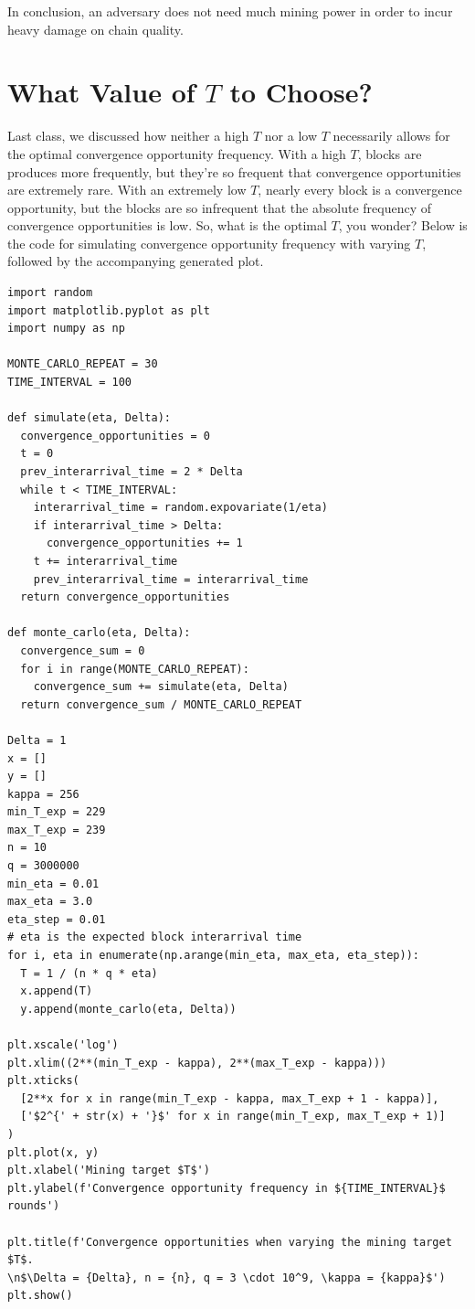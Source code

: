 In conclusion, an adversary does not need much mining power in order to incur heavy damage on chain quality.

\section{What Value of $T$ to Choose?}
Last class, we discussed how neither a high $T$ nor a low $T$ necessarily allows for the optimal convergence opportunity frequency. With a high $T$, blocks are produces more frequently, but they're so frequent that convergence opportunities are extremely rare. With an extremely low $T$, nearly every block is a convergence opportunity, but the blocks are so infrequent that the absolute frequency of convergence opportunities is low. So, what is the optimal $T$, you wonder? Below is the code for simulating convergence opportunity frequency with varying $T$, followed by the accompanying generated plot.
\begin{tcolorbox}[colback=gray!30]
{\small\begin{alltt}
\begin{verbatim}
import random
import matplotlib.pyplot as plt
import numpy as np

MONTE_CARLO_REPEAT = 30
TIME_INTERVAL = 100

def simulate(eta, Delta):
  convergence_opportunities = 0
  t = 0
  prev_interarrival_time = 2 * Delta
  while t < TIME_INTERVAL:
    interarrival_time = random.expovariate(1/eta)
    if interarrival_time > Delta:
      convergence_opportunities += 1
    t += interarrival_time
    prev_interarrival_time = interarrival_time
  return convergence_opportunities

def monte_carlo(eta, Delta):
  convergence_sum = 0
  for i in range(MONTE_CARLO_REPEAT):
    convergence_sum += simulate(eta, Delta)
  return convergence_sum / MONTE_CARLO_REPEAT

Delta = 1
x = []
y = []
kappa = 256
min_T_exp = 229
max_T_exp = 239
n = 10
q = 3000000
min_eta = 0.01
max_eta = 3.0
eta_step = 0.01
# eta is the expected block interarrival time
for i, eta in enumerate(np.arange(min_eta, max_eta, eta_step)):
  T = 1 / (n * q * eta)
  x.append(T)
  y.append(monte_carlo(eta, Delta))

plt.xscale('log')
plt.xlim((2**(min_T_exp - kappa), 2**(max_T_exp - kappa)))
plt.xticks(
  [2**x for x in range(min_T_exp - kappa, max_T_exp + 1 - kappa)],
  ['$2^{' + str(x) + '}$' for x in range(min_T_exp, max_T_exp + 1)]
)
plt.plot(x, y)
plt.xlabel('Mining target $T$')
plt.ylabel(f'Convergence opportunity frequency in ${TIME_INTERVAL}$ rounds')

plt.title(f'Convergence opportunities when varying the mining target $T$.
\n$\Delta = {Delta}, n = {n}, q = 3 \cdot 10^9, \kappa = {kappa}$')
plt.show()

\end{verbatim}
\end{alltt}}
\end{tcolorbox}


